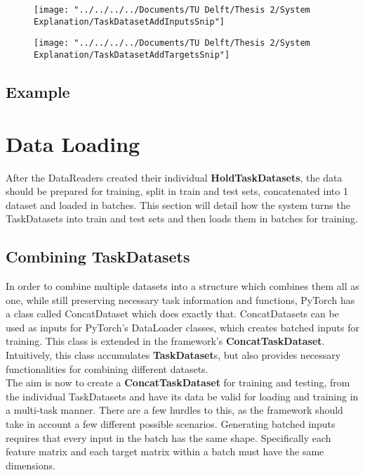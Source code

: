 \begin{figure}
	\centering
	\texttt{[image: "../../../../Documents/TU Delft/Thesis 2/System Explanation/TaskDatasetAddInputsSnip"]}
	\caption{}
	\label{fig:taskdatasetaddinputssnip}
\end{figure}

\begin{figure}
	\centering
	\texttt{[image: "../../../../Documents/TU Delft/Thesis 2/System Explanation/TaskDatasetAddTargetsSnip"]}
	\caption{}
	\label{fig:taskdatasetaddtargetssnip}
\end{figure}


\subsection{Example}




\section{Data Loading} \label{Impl:DataLoad}

After the DataReaders created their individual \textbf{HoldTaskDatasets}, the data should be prepared for training, split in train and test sets, concatenated into 1 dataset and loaded in batches.  This section will detail how the system turns the TaskDatasets into train and test sets and then loads them in batches for training. \\

\subsection{Combining TaskDatasets} \label{Impl:DataLoad:Combining}

In order to combine multiple datasets into a structure which combines them all as one, while still preserving necessary task information and functions, PyTorch has a class called ConcatDataset which does exactly that. ConcatDatasets can be used as inputs for PyTorch's DataLoader classes, which creates batched inputs for training. This class is extended in the framework's \textbf{ConcatTaskDataset}. Intuitively, this class accumulates \textbf{TaskDataset}s, but also provides necessary functionalities for combining different datasets. \\

The aim is now to create a \textbf{ConcatTaskDataset} for training and testing, from the individual TaskDatasets and have its data be valid for loading and training in a multi-task manner. There are a few hurdles to this, as the framework should take in account a few different possible scenarios. Generating batched inputs requires that every input in the batch has the same shape. Specifically each feature matrix and each target matrix within a batch must have the same dimensions. \\

